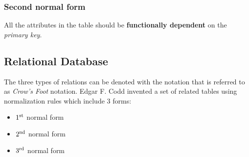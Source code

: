 \documentclass{article}
\begin{document}
\subsubsection{Second normal form}
All the attributes in the table should be \textbf{functionally dependent} on the \emph{primary key}.

	
	\subsection{Relational Database}
	The three types of relations can be denoted with the notation that is referred to as \textit{Crow's Foot} notation. Edgar F.	Codd invented a set of related tables using normalization rules which include 3 forms:
		\begin{itemize}
			\item{$1\textsuperscript{st}$ normal form}
			\item{$2\textsuperscript{nd}$ normal form}
			\item{$3\textsuperscript{rd}$ normal form}
		\end{itemize}
\end{document}
